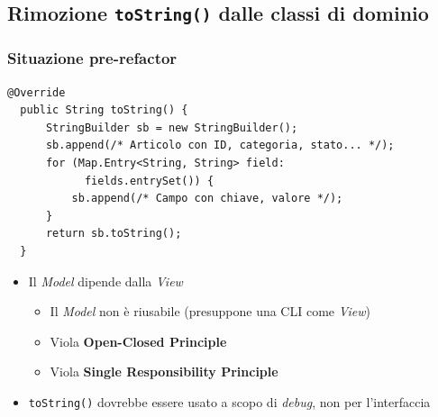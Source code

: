 
\subsection{Rimozione \texttt{toString()} dalle classi di dominio}
\begin{frame}[fragile]
  \frametitle{Situazione pre-refactor}
  \begin{lstlisting}[autogobble, title={\texttt{toString()} di \texttt{Article.java}}]
  @Override
  public String toString() {
      StringBuilder sb = new StringBuilder();
      sb.append(/* Articolo con ID, categoria, stato... */);
      for (Map.Entry<String, String> field:
            fields.entrySet()) {
          sb.append(/* Campo con chiave, valore */);
      }
      return sb.toString();
  }
  \end{lstlisting}

  \begin{itemize}
    \item Il \emph{Model} dipende dalla \emph{View}
    \begin{itemize}
      \item Il \emph{Model} non è riusabile (presuppone una CLI come \emph{View})
      \item Viola \textbf{Open-Closed Principle}
      \item Viola \textbf{Single Responsibility Principle}
    \end{itemize}
    \item \texttt{toString()} dovrebbe essere usato a scopo di \emph{debug}, non per l'interfaccia
  \end{itemize}
\end{frame}

